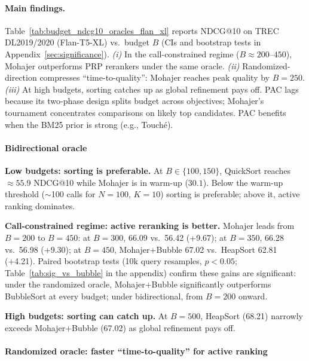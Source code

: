 \documentclass{llmxive}
\begin{document}
\vspace{-0.2cm}
\paragraph{Main findings.}
Table~\ref{tab:budget_ndcg10_oracles_flan_xl} reports NDCG@10 on TREC DL2019/2020 (Flan-T5-XL) vs.\ budget $B$ (CIs and bootstrap tests in Appendix~\ref{sec:significance}).
\emph{(i)} In the call-constrained regime ($B \approx 200$--$450$), Mohajer outperforms PRP rerankers under the same oracle.
\emph{(ii)} Randomized-direction compresses ``time-to-quality'': Mohajer reaches peak quality by $B{=}250$.
\emph{(iii)} At high budgets, sorting catches up as global refinement pays off.
PAC lags because its two-phase design splits budget across objectives; Mohajer's tournament concentrates comparisons on likely top candidates. PAC benefits when the BM25 prior is strong (e.g., Touché).




\vspace{-0.2cm}
\paragraph{Bidirectional oracle}
\label{sec:ar-vs-sorting}

\noindent\textbf{Low budgets: sorting is preferable.}
At $B \in \{100,150\}$, QuickSort reaches $\approx 55.9$ NDCG@10 while Mohajer is in warm-up ($30.1$). Below the warm-up threshold ($\sim$100 calls for $N{=}100$, $K{=}10$) sorting is preferable; above it, active ranking dominates.

\noindent\textbf{Call-constrained regime: active reranking is better.}
Mohajer leads from $B{=}200$ to $B{=}450$: at $B{=}300$, 66.09 vs.\ 56.42 (+9.67); at $B{=}350$, 66.28 vs.\ 56.98 (+9.30); at $B{=}450$, Mohajer+Bubble 67.02 vs.\ HeapSort 62.81 (+4.21).
Paired bootstrap tests (10k query resamples, $p{<}0.05$; Table~\ref{tab:sig_vs_bubble} in the appendix) confirm these gains are significant: under the randomized oracle, Mohajer+Bubble significantly outperforms BubbleSort at every budget; under bidirectional, from $B{=}200$ onward.

\noindent\textbf{High budgets: sorting can catch up.} At $B{=}500$, HeapSort (68.21) narrowly exceeds Mohajer+Bubble (67.02) as global refinement pays off.

\vspace{-0.2cm}
\paragraph{Randomized oracle: faster ``time-to-quality'' for active ranking}
\label{sec:stochastic-oracle-vs-sorting}
\end{document}
